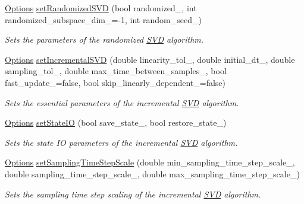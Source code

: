 \begin{DoxyCompactItemize}
\hyperlink{class_c_a_r_o_m_1_1_options}{Options} \hyperlink{class_c_a_r_o_m_1_1_options_a9671d1b229b77ad7920e34538fffe545}{set\-Randomized\-S\-V\-D} (bool randomized\-\_\-, int randomized\-\_\-subspace\-\_\-dim\-\_\-=-\/1, int random\-\_\-seed\-\_)
\begin{DoxyCompactList}\small\item\em Sets the parameters of the randomized \hyperlink{class_c_a_r_o_m_1_1_s_v_d}{S\-V\-D} algorithm. \end{DoxyCompactList}\item 
\hyperlink{class_c_a_r_o_m_1_1_options}{Options} \hyperlink{class_c_a_r_o_m_1_1_options_a7645650c79d11d98e5bcbcda17082427}{set\-Incremental\-S\-V\-D} (double linearity\-\_\-tol\-\_\-, double initial\-\_\-dt\-\_\-, double sampling\-\_\-tol\-\_\-, double max\-\_\-time\-\_\-between\-\_\-samples\-\_\-, bool fast\-\_\-update\-\_\-=false, bool skip\-\_\-linearly\-\_\-dependent\-\_\-=false)
\begin{DoxyCompactList}\small\item\em Sets the essential parameters of the incremental \hyperlink{class_c_a_r_o_m_1_1_s_v_d}{S\-V\-D} algorithm. \end{DoxyCompactList}\item 
\hyperlink{class_c_a_r_o_m_1_1_options}{Options} \hyperlink{class_c_a_r_o_m_1_1_options_abd0d6542bd910164fbbf5065928a4b44}{set\-State\-I\-O} (bool save\-\_\-state\-\_\-, bool restore\-\_\-state\-\_\-)
\begin{DoxyCompactList}\small\item\em Sets the state I\-O parameters of the incremental \hyperlink{class_c_a_r_o_m_1_1_s_v_d}{S\-V\-D} algorithm. \end{DoxyCompactList}\item 
\hyperlink{class_c_a_r_o_m_1_1_options}{Options} \hyperlink{class_c_a_r_o_m_1_1_options_a61449695e0b8e088c19a66702e1b30be}{set\-Sampling\-Time\-Step\-Scale} (double min\-\_\-sampling\-\_\-time\-\_\-step\-\_\-scale\-\_\-, double sampling\-\_\-time\-\_\-step\-\_\-scale\-\_\-, double max\-\_\-sampling\-\_\-time\-\_\-step\-\_\-scale\-\_\-)
\begin{DoxyCompactList}\small\item\em Sets the sampling time step scaling of the incremental \hyperlink{class_c_a_r_o_m_1_1_s_v_d}{S\-V\-D} algorithm. \end{DoxyCompactList}\end{DoxyCompactItemize}
